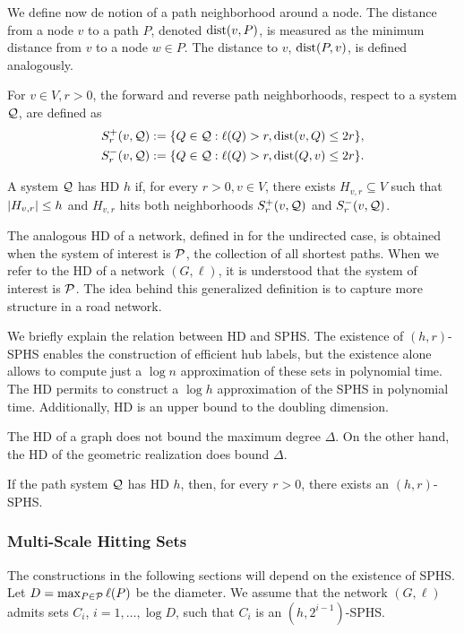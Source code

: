 We define now de notion of a path neighborhood around a node.
The distance from a node $v$ to a path $P$, denoted $\text{dist}(v,P)$, is measured as the minimum distance from $v$ to a node $w\in P$.
The distance to $v$, $\text{dist}(P,v)$, is defined analogously.

\begin{definition}
For $v\in V, r>0$, the forward and reverse path neighborhoods, respect to a system $\mathcal{Q}$, are defined as 
\begin{align*}
S_r^+(v,\mathcal{Q}) &:=\{Q\in\mathcal{Q}:\ell(Q)>r,  \text{dist}(v,Q)\leq 2r \}, \\  
S_r^-(v,\mathcal{Q}) &:=\{Q\in\mathcal{Q}:\ell(Q)>r,  \text{dist}(Q,v)\leq 2r \}.
\end{align*}
\end{definition}

\begin{definition}
A system $\mathcal{Q}$ has HD $h$ if, for every $r>0, v\in V$, there exists $H_{v,r}\subseteq V$ such that $\lvert H_{v,r}\rvert\leq h$ and $H_{v,r}$ hits both neighborhoods $S_r^+(v,\mathcal{Q})$ and $S_r^-(v,\mathcal{Q})$.
\end{definition}

The analogous HD of a network, defined in \citet{highway2013} for the undirected case, is obtained when the system of interest is $\mathcal{P}$, the collection of all shortest paths.
When we refer to the HD of a network $(G,\ell)$, it is understood that the system of interest is $\mathcal{P}$.
The idea behind this generalized definition is to capture more structure in a road network.

We briefly explain the relation between HD and SPHS.
The existence of $(h,r)$-SPHS enables the construction of efficient hub labels, but the existence alone allows to compute just a $\log n$ approximation of these sets in polynomial time.
The HD permits to construct a $\log h$ approximation of the SPHS in polynomial time.
Additionally, HD is an upper bound to the doubling dimension.

The HD of a graph does not bound the maximum degree $\Delta$.
On the other hand, the HD of the geometric realization does bound $\Delta$.

\begin{proposition}
If the path system $\mathcal{Q}$ has HD $h$, then, for every $r>0$, there exists an $(h,r)$-SPHS.
\end{proposition}

\subsubsection{Multi-Scale Hitting Sets} \label{sec:multi_scale}
The constructions in the following sections will depend on the existence of SPHS.
Let $D=\max_{P\in\mathcal{P}}\ell(P)$ be the diameter.
We assume that the network $(G,\ell)$ admits sets $C_i$, $i=1,\ldots,\log D$, such that $C_i$ is an $(h,2^{i-1})$-SPHS.


